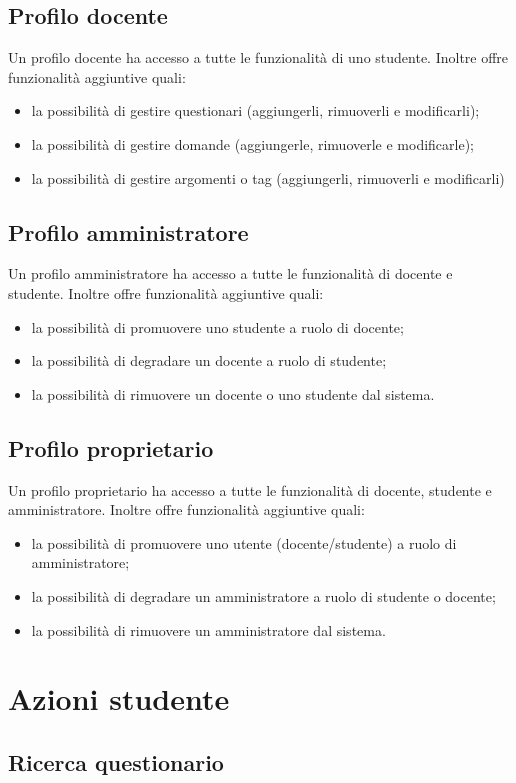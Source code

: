 \documentclass[12pt,a4paper]{article}
\begin{document}
	\subsection{Profilo docente}
	Un profilo docente ha accesso a tutte le funzionalità di uno studente.
		Inoltre offre funzionalità aggiuntive quali:
		\begin{itemize}
			\item la possibilità di gestire questionari (aggiungerli, rimuoverli e modificarli);
			\item la possibilità di gestire domande (aggiungerle, rimuoverle e modificarle);
			\item la possibilità di gestire argomenti o tag (aggiungerli, rimuoverli e modificarli)
		\end{itemize}
	\subsection{Profilo amministratore}
	Un profilo amministratore ha accesso a tutte le funzionalità di docente e studente.
	Inoltre offre funzionalità aggiuntive quali:
	\begin{itemize}
		\item la possibilità di promuovere uno studente a ruolo di docente;
		\item la possibilità di degradare un docente a ruolo di studente;
		\item la possibilità di rimuovere un docente o uno studente dal sistema.
	\end{itemize}
	\subsection{Profilo proprietario} 
	Un profilo proprietario ha accesso a tutte le funzionalità di docente, studente e amministratore.
	Inoltre offre funzionalità aggiuntive quali:
	\begin{itemize}
		\item la possibilità di promuovere uno utente (docente/studente) a ruolo di amministratore;
		\item la possibilità di degradare un amministratore a ruolo di studente o docente;
		\item la possibilità di rimuovere un amministratore dal sistema.
	\end{itemize}
	\newpage
	\section{Azioni studente}
	\subsection{Ricerca questionario}
\end{document}
